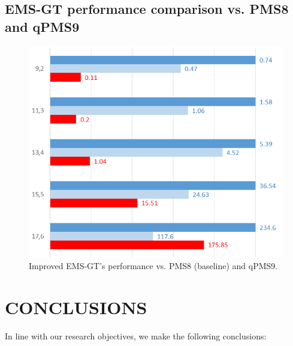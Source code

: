 \documentclass[oneside,12pt]{DISCSthesis}
\begin{document}
{%
		\newpage

	\section{EMS-GT performance comparison vs. PMS8 and qPMS9}

		\begin{figure}[ht]\label{fig:results2}
			\centering
			\includegraphics[width=5.0in]{img/results2.png}
			\caption{Improved EMS-GT's performance vs. PMS8 (baseline) and qPMS9.}
			\end{figure}


\chapter{CONCLUSIONS}
	In line with our research objectives, we make the following conclusions:

}
\end{document}
